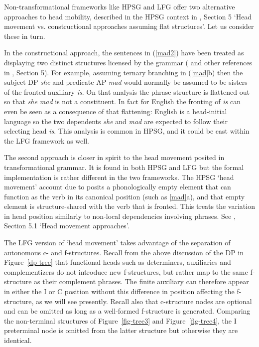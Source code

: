 \eal 
\label{mad2}
\zl
Non-transformational frameworks like HPSG and LFG offer two alternative approaches to head mobility, described in the HPSG context in , Section 5 `Head movement vs. constructional approaches assuming flat structures'.  Let us consider these in turn.

In the constructional approach,  
 the sentences in (\ref{mad2}) have been treated as displaying two distinct structures licensed by the grammar (\citet{Sag2020a} and other references in , Section 5).  For example, assuming ternary branching in (\ref{mad}b) then the subject DP \textit{she} and predicate AP \textit{mad} would normally be assumed to be sisters of the fronted auxiliary \textit{is}.  On that analysis the phrase structure is flattened out so that \textit{she mad} is not a constituent.  In fact for English the fronting of \textit{is} can even be seen as a consequence of that flattening:  English is a head-initial language so the two dependents \textit{she} and \textit{mad} are expected to follow their selecting head \textit{is}.  This analysis is common in HPSG, and it could be cast within the LFG framework as well.  

The second approach is closer in spirit to the head movement posited in transformational grammar.  It is found in both HPSG and LFG but the formal implementation is rather different in the two frameworks.  The HPSG `head movement' account due to \citet{Borsley89} posits a phonologically empty element that can function as the verb in its canonical position (such as \ref{mad}a), and that empty element is structure-shared with the verb that is fronted.  This treats the variation in head position similarly to non-local dependencies involving phrases.  See , Section 5.1 `Head movement approaches'. 

The LFG version of `head movement' takes advantage of  the separation of autonomous c- and f-structures.  Recall from the above discussion of the DP in Figure~\ref{dp-tree} that functional heads such as determiners, auxiliaries and complementizers do not introduce new f-structures, but rather map to the same f-structure as their complement phrases.   The finite auxiliary can therefore appear in either the I or C position without this difference in position affecting the f-structure, as we will see presently.  Recall also that c-structure nodes are optional and can be omitted as long as a well-formed f-structure is generated.  Comparing the non-terminal structures of Figure~\ref{fig-tree3} and Figure~\ref{fig-tree4}, the I preterminal node is omitted from the latter structure but otherwise they are identical.   

